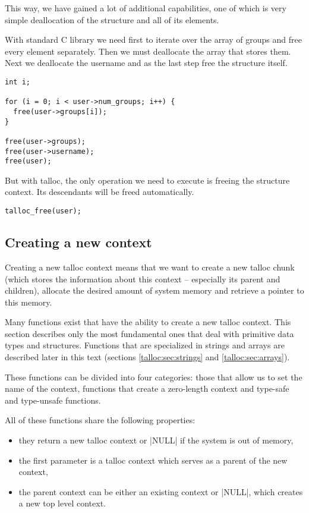 This way, we have gained a lot of additional capabilities, one of which is
very simple deallocation of the structure and all of its elements.

With standard C library we need first to iterate over the array of groups and
free every element separately. Then we must deallocate the array that stores
them. Next we deallocate the username and as the last step free the structure
itself.

\begin{lstlisting}[caption={Freeing struct user -- C standard library},
                   label={lst:free-struct-user-c}]
int i;

for (i = 0; i < user->num_groups; i++) {
  free(user->groups[i]);
}

free(user->groups);
free(user->username);
free(user);
\end{lstlisting}

\noindent
But with talloc, the only operation we need to execute is freeing the
structure context. Its descendants will be freed automatically.

\begin{lstlisting}[caption={Freeing struct user -- talloc library},
                   label={lst:free-struct-user-talloc}]
talloc_free(user);
\end{lstlisting}

\subsection{Creating a new context}
\label{talloc:subsec:new-context}

Creating a new talloc context means that we want to create a new talloc chunk
(which stores the information about this context -- especially its parent and
children), allocate the desired amount of system memory and retrieve a pointer
to this memory.

Many functions exist that have the ability to create a new talloc context. This
section describes only the most fundamental ones that deal with primitive data
types and structures. Functions that are specialized in strings and arrays are
described later in this text (sections \ref{talloc:sec:strings} and
\ref{talloc:sec:arrays}).

These functions can be divided into four categories: those that allow us to set
the name of the context, functions that create a zero-length context and
type-safe and type-unsafe functions.

All of these functions share the following properties:
\begin{itemize}
  \item they return a new talloc context or |NULL| if the system is out of
  memory,
  \item the first parameter is a talloc context which serves as a parent of
  the new context,
  \item the parent context can be either an existing context or |NULL|, which
  creates a new top level context.
\end{itemize}

